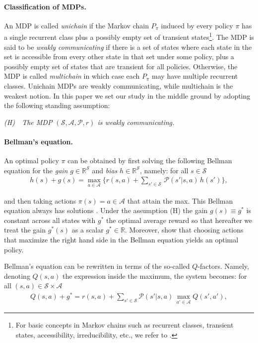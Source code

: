 \documentclass{article}
\newcommand{\cA}{\mathcal{A}}
\newcommand{\cS}{\mathcal{S}}
\newcommand{\cP}{\mathcal{P} }
\newcommand{\reals}{\mathbb{R}}
\newcommand{\R}{r}
\theoremstyle{plain}
\theoremstyle{definition}
\theoremstyle{remark}
\begin{document}
\paragraph{Classification of MDPs.}
An MDP is called \emph{unichain} if the Markov chain $P_\pi$ induced by every policy $\pi$ has a single recurrent class plus a possibly empty set of transient states\footnote{For basic concepts in Markov chains such as recurrent classes, transient states, accessibility, irreducibility, etc., we refer to \citet[Appendix A.2]{10.5555/528623}.}. The MDP is said to be \emph{weakly communicating} if there is a set of states where each state in the set is accessible from every other state in that set under some policy, plus a possibly empty set of states that are transient for all policies. Otherwise, the MDP is called \emph{multichain} in which case each $P_\pi$ may have multiple recurrent classes. Unichain MDPs are weakly communicating, while multichain is the weakest notion.  In this paper we set our 
study in the middle ground by adopting the following standing assumption:\\[1ex]
\centerline{\em {\sc (H)}~~The MDP $(\cS, \cA, \cP, \R)$ is weakly communicating.}

\paragraph{Bellman's equation.}
An optimal policy $\pi$ can be obtained by first solving the following  Bellman equation for the {\em gain} $g\in\reals^\cS$ and {\em bias} $h\in\reals^\cS$, namely: for all $s\in\cS$
\vspace{-1ex}
\begin{align*}
 h(s)+g(s)=\max_{a\in\cA}\big\{\R(s,a)+\sum_{s'\in\cS}\,\cP(s'|s,a)\,h(s')\big\},
\end{align*}

\vspace{-3ex}
and then taking actions $\pi(s)=a\in\cA$ 
that attain the max. 
This Bellman equation always has solutions \citep[Corollary~9.1.5]{10.5555/528623}. Under the assumption (H) the gain $g(s)\equiv g^*$ is constant across all states with $g^*$ the optimal average reward \citep[Theorems~8.3.2, 8.4.1, 9.1.2, 9.1.6] {10.5555/528623} so that hereafter we treat the gain  $g^*(s)$ as a scalar $g^*\in\reals$. Moreover, \citep[Theorems~9.1.7, 9.1.8] {10.5555/528623} show that choosing actions that maximize the right hand side in the Bellman equation yields an optimal policy. 

Bellman's equation can be rewritten in terms of the so-called $Q$-factors. Namely, denoting $Q(s,a)$ the expression inside the maximum, the system becomes: for all $(s,a)\in\cS\times\cA$
\vspace{-1ex}
\begin{align*}
Q(s,a)+g^*=\R(s,a)+\sum_{s'\in\cS}\cP(s'|s,a)\,\max_{a'\in\cA}Q(s',a'),
\end{align*}
\end{document}
